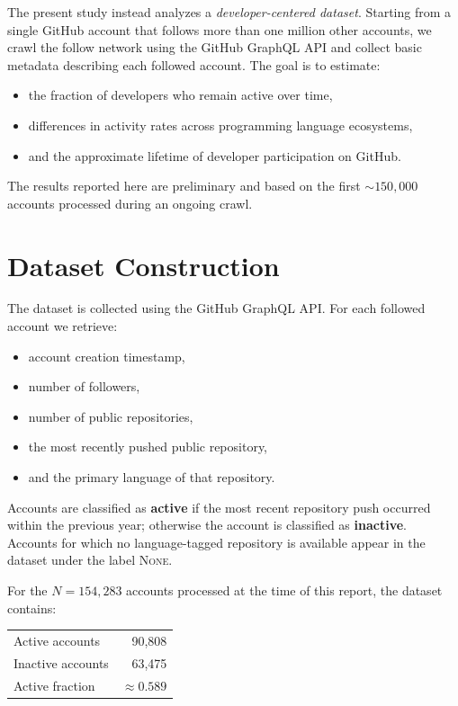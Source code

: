 \documentclass[12pt,a4paper]{article}
\begin{document}
The present study instead analyzes a \emph{developer-centered dataset}. Starting
from a single GitHub account that follows more than one million other accounts,
we crawl the follow network using the GitHub GraphQL API and collect basic
metadata describing each followed account. The goal is to estimate:
\begin{itemize}
\item the fraction of developers who remain active over time,
\item differences in activity rates across programming language ecosystems,
\item and the approximate lifetime of developer participation on GitHub.
\end{itemize}

The results reported here are preliminary and based on the first
$\sim150{,}000$ accounts processed during an ongoing crawl.

\section{Dataset Construction}

The dataset is collected using the GitHub GraphQL API. For each followed account
we retrieve:
\begin{itemize}
\item account creation timestamp,
\item number of followers,
\item number of public repositories,
\item the most recently pushed public repository,
\item and the primary language of that repository.
\end{itemize}

Accounts are classified as \textbf{active} if the most recent repository push
occurred within the previous year; otherwise the account is classified as
\textbf{inactive}. Accounts for which no language-tagged repository is available
appear in the dataset under the label \textsc{None}.

For the $N = 154{,}283$ accounts processed at the time of this report, the
dataset contains:

\begin{center}
\begin{tabular}{lr}
\toprule
Active accounts   & 90,808 \\
Inactive accounts & 63,475 \\
\midrule
Active fraction   & $\approx 0.589$ \\
\bottomrule
\end{tabular}
\end{center}
\end{document}
